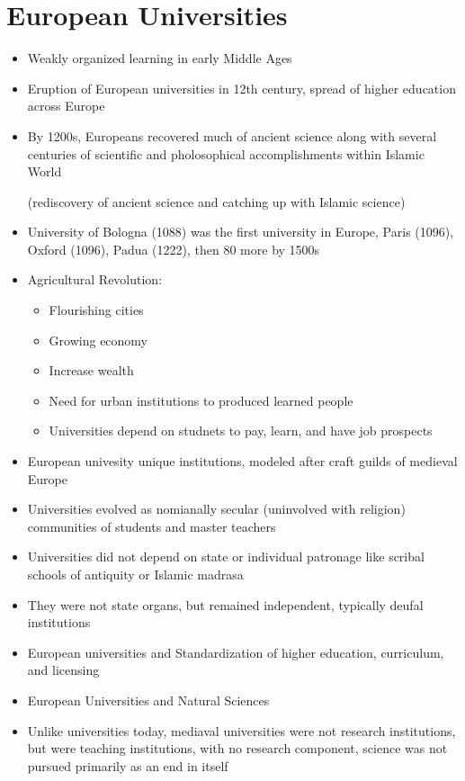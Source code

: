 \documentclass{article}
\begin{document}
\section*{European Universities}
\begin{itemize}
  \item Weakly organized learning in early Middle Ages
  \item Eruption of European universities in 12th century,
    spread of higher education across Europe
  \item By 1200s, Europeans recovered much of ancient science along with
    several centuries of scientific and pholosophical accomplishments within Islamic World

    (rediscovery of ancient science and catching up with Islamic science)
  \item University of Bologna (1088) was the first university in Europe,
    Paris (1096), Oxford (1096), Padua (1222), then 80 more by 1500s
  \item Agricultural Revolution:
    \begin{itemize}
      \item Flourishing cities
      \item Growing economy
      \item Increase wealth
      \item Need for urban institutions to produced learned people
      \item Universities depend on studnets to pay, learn, and have job prospects
    \end{itemize}
  \item European univesity unique institutions, modeled after craft guilds of medieval Europe
  \item Universities evolved as nomianally secular (uninvolved with religion) communities of students and master teachers
  \item Universities did not depend on state or individual patronage
    like scribal schools of antiquity or Islamic madrasa
  \item They were not state organs, but remained independent, typically deufal institutions
  \item European universities and Standardization of higher education, curriculum, and licensing
  \item European Universities and Natural Sciences
  \item Unlike universities today, mediaval universities were not research institutions,
    but were teaching institutions, with no research component,
    science was not pursued primarily as an end in itself
\end{itemize}
\end{document}
